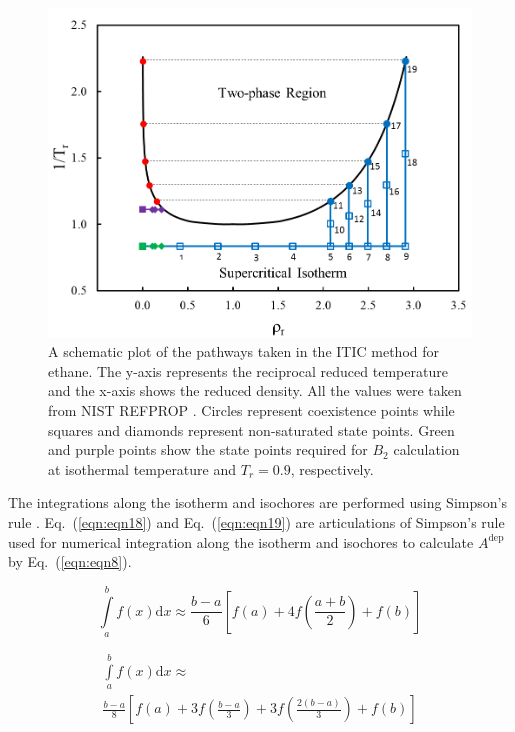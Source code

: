 \documentclass[%
 aip,
 jcp,
 sd,%
 amsmath,amssymb,
 reprint,%
]{revtex4-1}
\begin{document}
\begin{figure}
\includegraphics[scale=0.5]{Figures/ITIC-pathway-C2.png}
\caption{A schematic plot of the pathways taken in the ITIC method for ethane. The y-axis represents the reciprocal reduced temperature and the x-axis shows the reduced density. All the values were taken from NIST REFPROP \cite{Bucker2006}. Circles represent coexistence points while squares and diamonds represent non-saturated state points. Green and purple points show the state points required for $B_2$ calculation at isothermal temperature and $T_r=0.9$, respectively. }
\label{fig:ITICpathway}
\end{figure}

The integrations along the isotherm and isochores are performed using Simpson's rule \cite{atkinson2008}. Eq.~(\ref{eqn:eqn18}) and Eq.~(\ref{eqn:eqn19}) are
articulations of Simpson's rule used for numerical integration along the isotherm and isochores to calculate $A^{\mathrm{dep}}$ by Eq.~(\ref{eqn:eqn8}).

\begin{equation}
\int\limits_a^b {f(x)\mathrm{d} x \approx \frac{{b - a}}{6}} \left[ {f(a) + 4f \left( \frac{{a + b}}{2} \right) + f(b)} \right] \label{eqn:eqn18}
\end{equation}

\begin{equation}
\begin{array}{l}
{\int\limits_a^b f(x)\mathrm{d}x \approx }
\\ 
{{\frac{{b - a}}{8} \left[ {f(a) + 3f \left( \frac{{b - a}}{3} \right) + 3f \left( \frac{{2(b - a)}}{3} \right) + f(b)} \right]}}  
\end{array}
\label{eqn:eqn19}
\end{equation}
\end{document}
